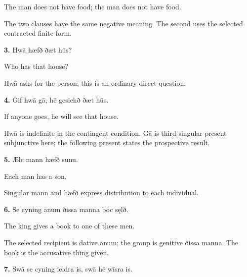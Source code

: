 The man does not have food; the man does not have food.

The two clauses have the same negative meaning. The second uses the selected contracted finite form.

\textbf{3.} Hwā hæfð ðæt hūs?

Who has that house?

Hwā asks for the person; this is an ordinary direct question.

\textbf{4.} Gif hwā gā, hē gesiehð ðæt hūs.

If anyone goes, he will see that house.

Hwā is indefinite in the contingent condition. Gā is third-singular present subjunctive here; the following present states the prospective result.

\textbf{5.} Ǣlc mann hæfð sunu.

Each man has a son.

Singular mann and hæfð express distribution to each individual.

\textbf{6.} Se cyning ānum ðissa manna bōc sęlð.

The king gives a book to one of these men.

The selected recipient is dative ānum; the group is genitive ðissa manna. The book is the accusative thing given.

\textbf{7.} Swā se cyning ieldra is, swā hē wīsra is.

